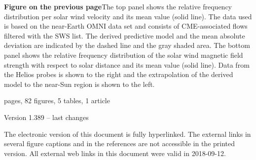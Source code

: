 \newpage

\vspace*{\fill}
\begin{small}
	\noindent \textbf{Figure on the previous page}\quad The top panel shows the relative \Kp{} frequency distribution per solar wind velocity and its mean value (solid line). The data used is based on the near-Earth OMNI data set and consists of CME-associated flows filtered with the SWS list. The derived predictive model and the mean absolute deviation are indicated by the dashed line and the gray shaded area.
	The bottom panel shows the relative frequency distribution of the solar wind magnetic field strength with respect to solar distance and its mean value (solid line). Data from the Helios probes is shown to the right and the extrapolation of the derived model to the near-Sun region is shown to the left.



	
	\vspace{1\baselineskip}
	
	 pages, 82 figures, 5 tables, 1 article

	\noindent Version 1.389 -- last changes \ISOToday{} \thistime{}
	
	\vspace{1\baselineskip}
	
	\noindent The electronic version of this document is fully hyperlinked. The external links in several figure captions and in the references are not accessible in the printed version. All external web links in this document were valid in 2018-09-12.
\end{small}

\normalsize

